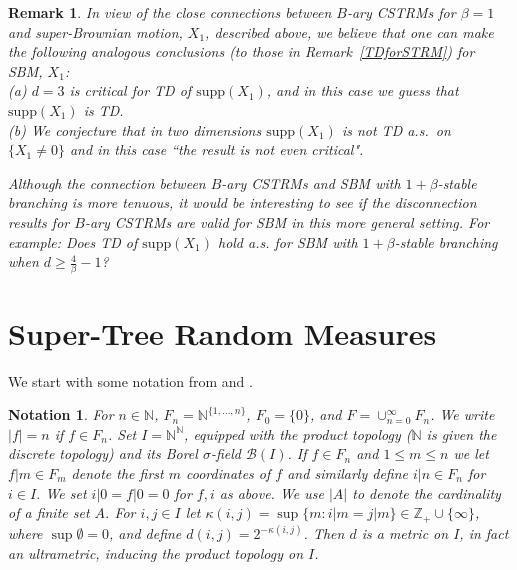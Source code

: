 \documentclass[12pt]{article}
\numberwithin{theorem}{section}
\newtheorem{remark}[theorem]{Remark}
\theoremstyle{def}
\newtheorem*{notation}{Notation}
\numberwithin{equation}{section}
\newcommand{\Z}{\mathbb{Z}}
\newcommand{\N}{\mathbb{N}}
\newcommand{\cB}{\mathcal B}
\newcommand{\supp}{\mathrm{supp}}
\begin{document}
\begin{remark}\label{SBMconjs}  In view of the close connections between $B$-ary CSTRMs for $\beta=1$  and super-Brownian motion, $X_1$, described above, we believe that one can make the following analogous conclusions (to those in Remark~\ref{TDforSTRM}) for SBM,  $X_1$:\\
\emph{(a)} $d=3$ is critical for TD of $\supp(X_1)$, and in this case we guess that $\supp(X_1)$ is TD.\\
\emph(b)  We conjecture that in two dimensions $\supp(X_1)$ is not TD a.s.\ on $\{X_1\neq 0\}$ and in this case ``the result is not even critical". 

Although the connection between $B$-ary CSTRMs and SBM with $1+\beta$-stable branching is more tenuous, it would be interesting to see if the disconnection results for $B$-ary CSTRMs are valid for SBM in this more general setting. 
For example: Does TD of $\supp(X_1)$ hold a.s. for SBM with $1+\beta$-stable branching when $d\ge \frac{4}{\beta}-1$?
\end{remark}


\section{Super-Tree Random Measures}\label{sec:STRM}

We start with some notation from \cite{H} and \cite{ADHP}.
\begin{notation}
For $n\in\N$, $F_n=\N^{\{1,\dots,n\}}$, $F_0=\{0\}$, and $F=\cup_{n=0}^\infty F_n$.  We write $|f|=n$ if $f\in F_n$.  Set $I=\N^\N$, equipped with the product topology ($\N$ is given the discrete topology) and its Borel $\sigma$-field $\cB(I)$. If $f\in F_n$ and $1\le m\le n$ we let $f|m\in F_m$ denote the first $m$ coordinates of $f$ and similarly define $i|n\in F_n$ for $i\in I$. We set $i|0=f|0=0$ for $f,i$ as above.
We use $|A|$ to denote the cardinality of a finite set $A$. 
For $i,j\in I$ let $\kappa(i,j)=\sup\{m:i|m=j|m\}\in\Z_+\cup\{\infty\}$, where $\sup\emptyset=0$, and define $d(i,j)=2^{-\kappa(i,j)}$. Then $d$ is a metric on $I$, in fact an ultrametric, inducing the product topology on $I$. 
\end{notation}
\end{document}
